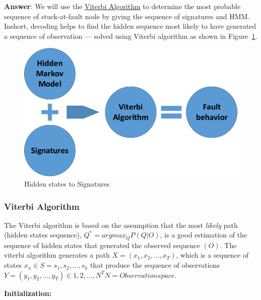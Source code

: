\textbf{Answer}: We will use the \underline{Viterbi Algorithm} to determine the most probable sequence of stuck-at-fault node by giving the sequence of signatures and HMM. Inshort, decoding helps to find the hidden sequence most likely to have generated a sequence of observation --- solved using Viterbi algorithm as shown in Figure~\ref{fig:HMMsig-Vit}.


\begin{figure}[tb!]

 \centering
  \captionsetup{justification=centering}    
   \includegraphics[scale=0.8]{Figures/HMM-plus-viterbi.pdf}
   \caption{Hidden states to Signatures}
\label{fig:HMMsig-Vit}
\end{figure}

\subsubsection{Viterbi Algorithm}


The Viterbi algorithm is based on the assumption that the most \textit{likely} path (hidden states sequence), $Q^* = argmax_Q P(Q|O) $, is a good estimation of the sequence of hidden states that generated the observed sequence $(O)$. The viterbi algorithm generates a path $X = (x_1, x_2,...,x_T)$, which is a sequence of states $x_n \in S = {s_1, s_2,...,s_k}$ that produce the sequence of observations $Y = (y_1,y_2,...,y_T) \in {1,2,...,N}^T N = Observation space$.

\textbf{Initialization:}



